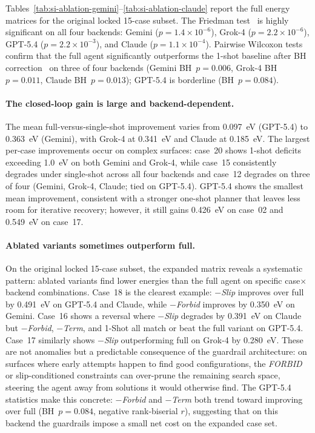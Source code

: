 Tables~\ref{tab:si-ablation-gemini}--\ref{tab:si-ablation-claude} report the full energy matrices for the original locked 15-case subset.
The Friedman test~\cite{friedman1937use} is highly significant on all four backends: Gemini ($p = 1.4 \times 10^{-6}$), Grok-4 ($p = 2.2 \times 10^{-6}$), GPT-5.4 ($p = 2.2 \times 10^{-3}$), and Claude ($p = 1.1 \times 10^{-4}$).
Pairwise Wilcoxon tests~\cite{wilcoxon1945individual} confirm that the full agent significantly outperforms the 1-shot baseline after BH correction~\cite{benjamini1995controlling} on three of four backends (Gemini BH~$p = 0.006$, Grok-4 BH~$p = 0.011$, Claude BH~$p = 0.013$); GPT-5.4 is borderline (BH~$p = 0.084$).

\paragraph{The closed-loop gain is large and backend-dependent.}
The mean full-versus-single-shot improvement varies from 0.097~eV (GPT-5.4) to 0.363~eV (Gemini), with Grok-4 at 0.341~eV and Claude at 0.185~eV.
The largest per-case improvements occur on complex surfaces: case~20 shows 1-shot deficits exceeding 1.0~eV on both Gemini and Grok-4, while case~15 consistently degrades under single-shot across all four backends and case~12 degrades on three of four (Gemini, Grok-4, Claude; tied on GPT-5.4).
GPT-5.4 shows the smallest mean improvement, consistent with a stronger one-shot planner that leaves less room for iterative recovery; however, it still gains 0.426~eV on case~02 and 0.549~eV on case~17.

\paragraph{Ablated variants sometimes outperform full.}
On the original locked 15-case subset, the expanded matrix reveals a systematic pattern: ablated variants find lower energies than the full agent on specific case$\times$backend combinations.
Case~18 is the clearest example: \textit{$-$Slip} improves over full by 0.491~eV on GPT-5.4 and Claude, while \textit{$-$Forbid} improves by 0.350~eV on Gemini.
Case~16 shows a reversal where \textit{$-$Slip} degrades by 0.391~eV on Claude but \textit{$-$Forbid}, \textit{$-$Term}, and 1-Shot all match or beat the full variant on GPT-5.4.
Case~17 similarly shows \textit{$-$Slip} outperforming full on Grok-4 by 0.280~eV.
These are not anomalies but a predictable consequence of the guardrail architecture: on surfaces where early attempts happen to find good configurations, the \textit{FORBID} or slip-conditioned constraints can over-prune the remaining search space, steering the agent away from solutions it would otherwise find.
The GPT-5.4 statistics make this concrete: \textit{$-$Forbid} and \textit{$-$Term} both trend toward improving over full (BH~$p = 0.084$, negative rank-biserial $r$), suggesting that on this backend the guardrails impose a small net cost on the expanded case set.

